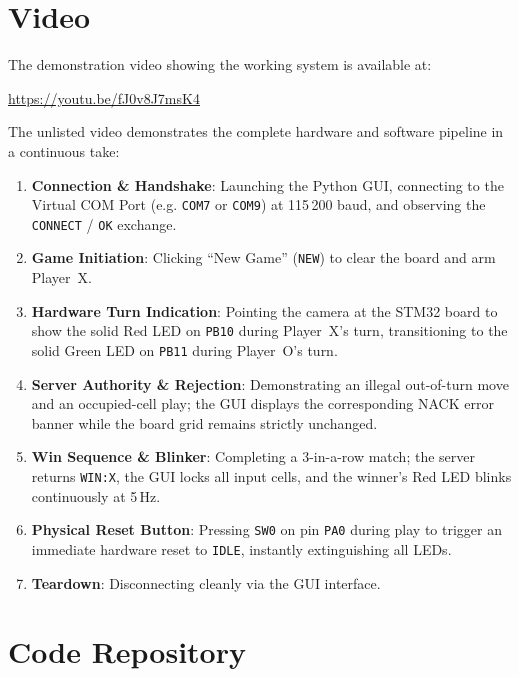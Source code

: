 \section{Video}
\label{sec:video}


The demonstration video showing the working system is available at:
\begin{center}
\url{https://youtu.be/fJ0v8J7msK4}
\end{center}

The unlisted video demonstrates the complete hardware and software pipeline in a continuous take:
\begin{enumerate}
    \item \textbf{Connection \& Handshake}: Launching the Python GUI, connecting to the Virtual COM Port (e.g. \texttt{COM7} or \texttt{COM9}) at 115\,200 baud, and observing the \texttt{CONNECT} / \texttt{OK} exchange.
    \item \textbf{Game Initiation}: Clicking ``New Game'' (\texttt{NEW}) to clear the board and arm Player~X.
    \item \textbf{Hardware Turn Indication}: Pointing the camera at the STM32 board to show the solid Red LED on \texttt{PB10} during Player~X's turn, transitioning to the solid Green LED on \texttt{PB11} during Player~O's turn.
    \item \textbf{Server Authority \& Rejection}: Demonstrating an illegal out-of-turn move and an occupied-cell play; the GUI displays the corresponding NACK error banner while the board grid remains strictly unchanged.
    \item \textbf{Win Sequence \& Blinker}: Completing a 3-in-a-row match; the server returns \texttt{WIN:X}, the GUI locks all input cells, and the winner's Red LED blinks continuously at 5\,Hz.
    \item \textbf{Physical Reset Button}: Pressing \texttt{SW0} on pin \texttt{PA0} during play to trigger an immediate hardware reset to \texttt{IDLE}, instantly extinguishing all LEDs.
    \item \textbf{Teardown}: Disconnecting cleanly via the GUI interface.
\end{enumerate}

\section{Code Repository}
\label{sec:code}

